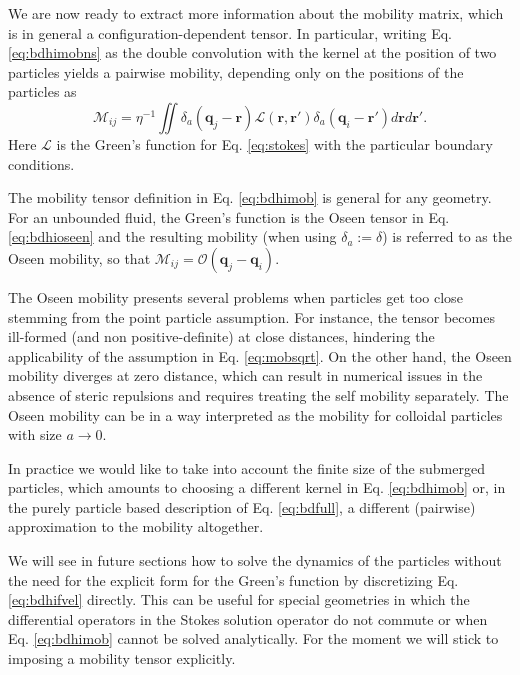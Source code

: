 \documentclass[ twoside,openright,titlepage,numbers=noenddot,%
headinclude,footinclude,cleardoublepage=empty,abstract=on,
BCOR=5mm,paper=b5,fontsize=11pt, dvipsnames
]{scrreprt}
\renewcommand{\vec}[1]{\bm{#1}}
\newcommand{\tens}[1]{\bm{\mathcal{#1}}}
\newcommand{\oper}[1]{\mathcal{#1}}
\newcommand{\ppos}{q}
\begin{document}
We are now ready to extract more information about the mobility matrix, which is in general a configuration-dependent tensor. In particular, writing Eq. \eqref{eq:bdhimobns} as the double convolution with the kernel at the position of two particles yields a pairwise mobility, depending only on the positions of the particles as
\begin{equation}
  \label{eq:bdhimob}
  \tens{M}_{ij} = \eta^{-1}\iint{\delta_a(\vec{q}_j-\vec{r})\oper{L}(\vec{r}, \vec{r}')\delta_a(\vec{q}_i -\vec{r}')d\vec{r}d\vec{r}'}.
\end{equation}
Here $\oper{L}$ is the Green's function for Eq. \eqref{eq:stokes} with the particular boundary conditions.

The mobility tensor definition in Eq. \eqref{eq:bdhimob} is general for any geometry. For an unbounded fluid, the Green's function is the Oseen tensor in Eq. \eqref{eq:bdhioseen} and the resulting mobility (when using $\delta_a:=\delta$) is referred to as the Oseen mobility, so that $\tens{M}_{ij} = \tens{O}(\vec{\ppos}_j - \vec{\ppos}_i)$.

The Oseen mobility presents several problems when particles get too close stemming from the point particle assumption. For instance, the tensor becomes ill-formed (and non positive-definite) at close distances, hindering the applicability of the assumption in Eq. \eqref{eq:mobsqrt}. On the other hand, the Oseen mobility diverges at zero distance, which can result in numerical issues in the absence of steric repulsions and requires treating the self mobility separately. The Oseen mobility can be in a way interpreted as the mobility for colloidal particles with size $a\rightarrow 0$.

In practice we would like to take into account the finite size of the submerged particles, which amounts to choosing a different kernel in Eq. \eqref{eq:bdhimob} or, in the purely particle based description of Eq. \eqref{eq:bdfull}, a different (pairwise) approximation to the mobility altogether.

We will see in future sections how to solve the dynamics of the particles without the need for the explicit form for the Green's function by discretizing Eq. \eqref{eq:bdhifvel} directly. This can be useful for special geometries in which the differential operators in the Stokes solution operator do not commute or when Eq. \eqref{eq:bdhimob} cannot be solved analytically. For the moment we will stick to imposing a mobility tensor explicitly.
\end{document}
